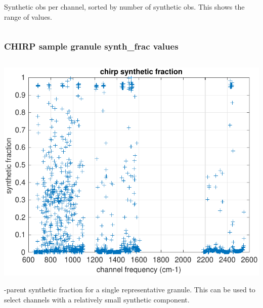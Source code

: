\documentclass[9pt]{beamer}
\begin{document}
\begin{frame}
\begin{columns}[t]
\begin{column}{0.5\textwidth}
Synthetic obs per channel, sorted by number of synthetic obs.  This
shows the range of values.

\end{column}
\end{columns}
\end{frame}
\begin{frame}
\frametitle{CHIRP sample granule synth\_frac values}
\begin{columns}[t]
\begin{column}{0.5\textwidth}  
  \begin{centering}
  \includegraphics[width=\textwidth]{figures/chirp_sample_syn_frac.pdf}
  \end{centering}\vspace{3mm}

{\airs}-parent {\chirp} synthetic fraction for a single representative
granule.  This can be used to select channels with a relatively small
synthetic component.

\end{column}


\end{columns}
\end{frame}
\end{document}
